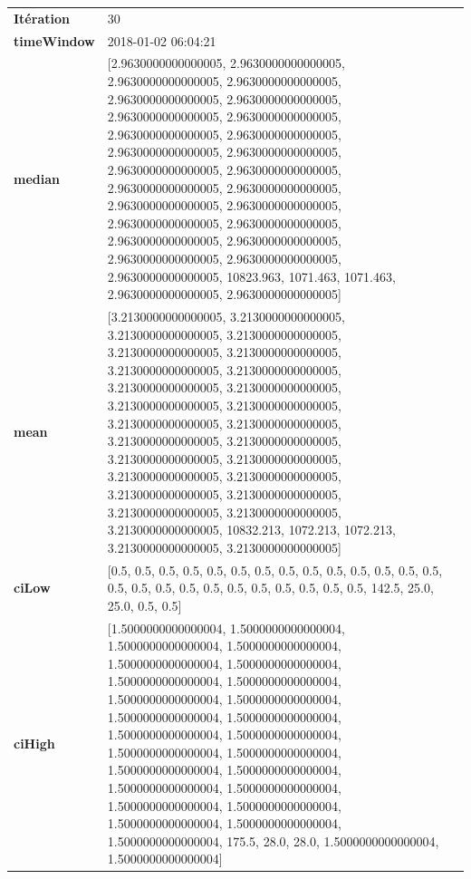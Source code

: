 \begin{table}[H]
	\centering
	\begin{tabularx}{\textwidth}{lX}
		\textbf{Itération}& 30\\
		\textbf{timeWindow} &2018-01-02 06:04:21 \\ 
		\textbf{median} &[2.9630000000000005, 2.9630000000000005, 2.9630000000000005, 2.9630000000000005, 2.9630000000000005, 2.9630000000000005, 2.9630000000000005, 2.9630000000000005, 2.9630000000000005, 2.9630000000000005, 2.9630000000000005, 2.9630000000000005, 2.9630000000000005, 2.9630000000000005, 2.9630000000000005, 2.9630000000000005, 2.9630000000000005, 2.9630000000000005, 2.9630000000000005, 2.9630000000000005, 2.9630000000000005, 2.9630000000000005, 2.9630000000000005, 2.9630000000000005, 2.9630000000000005, 10823.963, 1071.463, 1071.463, 2.9630000000000005, 2.9630000000000005]\\ 
		\textbf{mean} & [3.2130000000000005, 3.2130000000000005, 3.2130000000000005, 3.2130000000000005, 3.2130000000000005, 3.2130000000000005, 3.2130000000000005, 3.2130000000000005, 3.2130000000000005, 3.2130000000000005, 3.2130000000000005, 3.2130000000000005, 3.2130000000000005, 3.2130000000000005, 3.2130000000000005, 3.2130000000000005, 3.2130000000000005, 3.2130000000000005, 3.2130000000000005, 3.2130000000000005, 3.2130000000000005, 3.2130000000000005, 3.2130000000000005, 3.2130000000000005, 3.2130000000000005, 10832.213, 1072.213, 1072.213, 3.2130000000000005, 3.2130000000000005]\\ 
		\textbf{ciLow}& [0.5, 0.5, 0.5, 0.5, 0.5, 0.5, 0.5, 0.5, 0.5, 0.5, 0.5, 0.5, 0.5, 0.5, 0.5, 0.5, 0.5, 0.5, 0.5, 0.5, 0.5, 0.5, 0.5, 0.5, 0.5, 142.5, 25.0, 25.0, 0.5, 0.5] \\
		\textbf{ciHigh}& [1.5000000000000004, 1.5000000000000004, 1.5000000000000004, 1.5000000000000004, 1.5000000000000004, 1.5000000000000004, 1.5000000000000004, 1.5000000000000004, 1.5000000000000004, 1.5000000000000004, 1.5000000000000004, 1.5000000000000004, 1.5000000000000004, 1.5000000000000004, 1.5000000000000004, 1.5000000000000004, 1.5000000000000004, 1.5000000000000004, 1.5000000000000004, 1.5000000000000004, 1.5000000000000004, 1.5000000000000004, 1.5000000000000004, 1.5000000000000004, 1.5000000000000004, 175.5, 28.0, 28.0, 1.5000000000000004, 1.5000000000000004] \\
							\end{tabularx} 
						\end{table}
						

